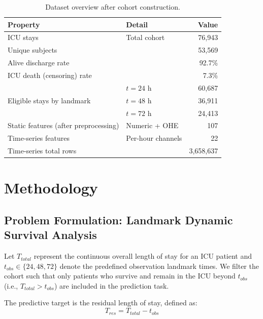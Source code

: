 \documentclass[10pt, a4paper]{article}
\begin{document}
\begin{table}[h]
\centering
\caption{Dataset overview after cohort construction.}
\label{tab:data_overview}
\begin{tabular}{llr}
\toprule
\textbf{Property} & \textbf{Detail} & \textbf{Value} \\
\midrule
ICU stays & Total cohort & 76{,}943 \\
Unique subjects & & 53{,}569 \\
Alive discharge rate & & 92.7\% \\
ICU death (censoring) rate & & 7.3\% \\
\midrule
\multirow{3}{*}{Eligible stays by landmark} & $t = 24$ h & 60{,}687 \\
& $t = 48$ h & 36{,}911 \\
& $t = 72$ h & 24{,}413 \\
\midrule
Static features (after preprocessing) & Numeric + OHE & 107 \\
Time-series features & Per-hour channels & 22 \\
Time-series total rows & & 3{,}658{,}637 \\
\bottomrule
\end{tabular}
\end{table}


\section{Methodology}
\label{sec:methods}

\subsection{Problem Formulation: Landmark Dynamic Survival Analysis}
\label{subsec:landmark_dynamic}

Let $T_{total}$ represent the continuous overall length of stay for an ICU patient and $t_{obs} \in \{24, 48, 72\}$ denote the predefined observation landmark times. We filter the cohort such that only patients who survive and remain in the ICU beyond $t_{obs}$ (i.e., $T_{total} > t_{obs}$) are included in the prediction task. 

The predictive target is the residual length of stay, defined as:
\begin{equation}
    T_{res} = T_{total} - t_{obs}
\end{equation}
\end{document}
